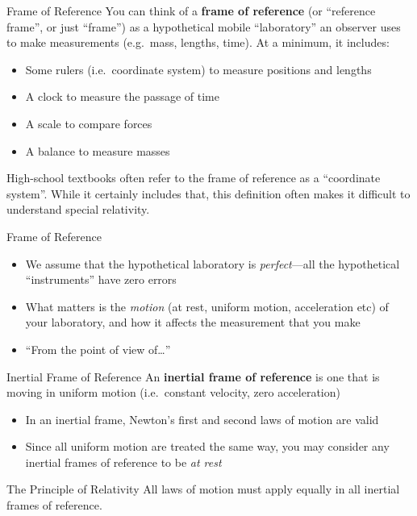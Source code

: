 \documentclass[12pt,compress,aspectratio=169]{beamer}
\begin{document}
\begin{frame}{Frame of Reference}
  You can think of a \textbf{frame of reference} (or ``reference frame'', or
  just ``frame'') as a hypothetical mobile ``laboratory'' an observer uses to
  make measurements (e.g.\ mass, lengths, time). At a minimum, it includes:
  \begin{itemize}
  \item Some rulers (i.e.\ coordinate system) to measure  positions and lengths
  \item A clock to measure the passage of time
  \item A scale to compare forces
  \item A balance to measure masses
  \end{itemize}
  \vspace{.15in}\textcolor{red!85}{High-school textbooks often refer to the
    frame of reference as a ``coordinate system''. While it certainly includes
    that, this definition often makes it difficult to understand special
    relativity.}
\end{frame}



\begin{frame}{Frame of Reference}
  \begin{itemize}
  \item We assume that the hypothetical laboratory is \emph{perfect}---all the
    hypothetical ``instruments'' have zero errors
  \item What matters is the \emph{motion} (at rest, uniform motion, acceleration
    etc) of your laboratory, and how it affects the measurement that you make
  \item ``From the point of view of\ldots''
  \end{itemize}
\end{frame}


\begin{frame}{Inertial Frame of Reference}
  An \textbf{inertial frame of reference} is one that is moving in uniform
  motion (i.e.\ constant velocity, zero acceleration)
  \begin{itemize}
  \item In an inertial frame, Newton's first and second laws of motion are valid
  \item Since all uniform motion are treated the same way, you may consider
    any inertial frames of reference to be \emph{at rest}
  \end{itemize}
  \vspace{.2in}
  \begin{block}{The Principle of Relativity}
    All laws of motion must apply equally in all inertial frames of reference.
  \end{block}
\end{frame}
\end{document}
